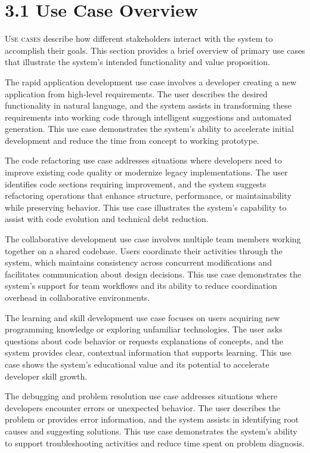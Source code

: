 
\section{3.1 Use Case Overview}
\label{sec:use-case-overview}

\lettrine{U}{se cases} describe how different stakeholders interact with the system to accomplish their goals. This section provides a brief overview of primary use cases that illustrate the system's intended functionality and value proposition.

The rapid application development use case involves a developer creating a new application from high-level requirements. The user describes the desired functionality in natural language, and the system assists in transforming these requirements into working code through intelligent suggestions and automated generation. This use case demonstrates the system's ability to accelerate initial development and reduce the time from concept to working prototype.

The code refactoring use case addresses situations where developers need to improve existing code quality or modernize legacy implementations. The user identifies code sections requiring improvement, and the system suggests refactoring operations that enhance structure, performance, or maintainability while preserving behavior. This use case illustrates the system's capability to assist with code evolution and technical debt reduction.

The collaborative development use case involves multiple team members working together on a shared codebase. Users coordinate their activities through the system, which maintains consistency across concurrent modifications and facilitates communication about design decisions. This use case demonstrates the system's support for team workflows and its ability to reduce coordination overhead in collaborative environments.

The learning and skill development use case focuses on users acquiring new programming knowledge or exploring unfamiliar technologies. The user asks questions about code behavior or requests explanations of concepts, and the system provides clear, contextual information that supports learning. This use case shows the system's educational value and its potential to accelerate developer skill growth.

The debugging and problem resolution use case addresses situations where developers encounter errors or unexpected behavior. The user describes the problem or provides error information, and the system assists in identifying root causes and suggesting solutions. This use case demonstrates the system's ability to support troubleshooting activities and reduce time spent on problem diagnosis.
